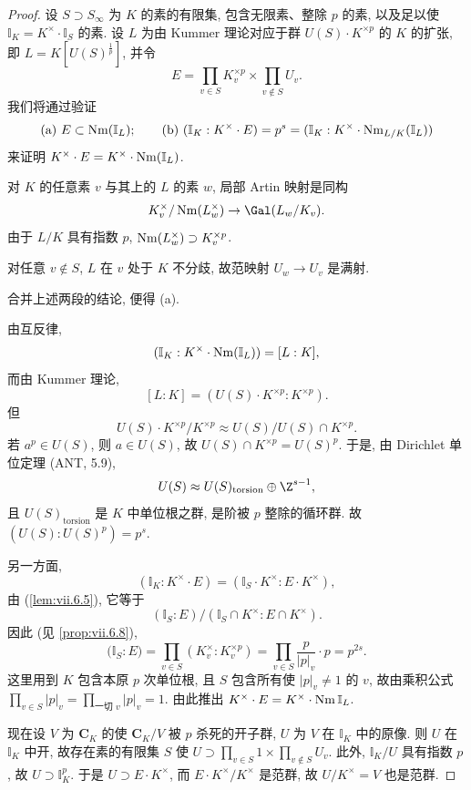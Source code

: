 \begin{proof}
设 $S\supset S_{\infty}$ 为 $K$ 的素的有限集, 包含无限素、整除 $p$ 的素, 以及足以使 $\mathbb{I}_K=K^{\times}\cdot\mathbb{I}_S$ 的素. 设 $L$ 为由 Kummer 理论对应于群 $U(S)\cdot K^{\times p}$ 的 $K$ 的扩张, 即 $L=K[U(S)^{\frac{1}{p}}]$, 并令
\[
E=\prod_{v\in S}K_{v}^{\times p}\times\prod_{v\notin S}U_{v}.
\]
我们将通过验证
\[
\text{(a)}\ E\subset\Nm(\mathbb{I}_{L});\qquad \text{(b)}\ (\mathbb{I}_{K}:K^{\times}\cdot E)=p^{s}=(\mathbb{I}_{K}:K^{\times}\cdot\Nm_{L/K}(\mathbb{I}_{L}))
\]
来证明 $K^{\times}\cdot E=K^{\times}\cdot\operatorname{Nm}(\mathbb{I}_L)$.

对 $K$ 的任意素 $v$ 与其上的 $L$ 的素 $w$, 局部 Artin 映射是同构
\[
K_{v}^{\times}/\Nm(L_{w}^{\times})\to\Gal(L_{w}/K_{v}).
\]
由于 $L/K$ 具有指数 $p$, $\operatorname{Nm}(L_{w}^{\times})\supset K_{v}^{\times p}$.

对任意 $v\notin S$, $L$ 在 $v$ 处于 $K$ 不分歧, 故范映射 $U_w\to U_v$ 是满射.

合并上述两段的结论, 便得 (a).

由互反律,
\[
(\mathbb{I}_{K}:K^{\times}\cdot\operatorname{Nm}(\mathbb{I}_{L}))=[L:K],
\]
而由 Kummer 理论,
\[
[L:K]=(U(S)\cdot K^{\times p}:K^{\times p}).
\]
但
\[
U(S)\cdot K^{\times p}/K^{\times p}\approx U(S)/U(S)\cap K^{\times p}.
\]
若 $a^{p}\in U(S)$, 则 $a\in U(S)$, 故 $U(S)\cap K^{\times p}=U(S)^{p}$. 于是, 由 Dirichlet 单位定理 (ANT, 5.9),
\[
U(S)\approx U(S)_{\mathrm{torsion}}\oplus\Z^{s-1},
\]
且 $U(S)_{\mathrm{torsion}}$ 是 $K$ 中单位根之群, 是阶被 $p$ 整除的循环群. 故 $(U(S):U(S)^{p})=p^{s}$.

另一方面,
\[
(\mathbb{I}_{K}:K^{\times}\cdot E)=(\mathbb{I}_{S}\cdot K^{\times}:E\cdot K^{\times}),
\]
由 (\ref{lem:vii.6.5}), 它等于
\[
(\mathbb{I}_{S}:E)/(\mathbb{I}_{S}\cap K^{\times}:E\cap K^{\times}).
\]
因此 (见 \ref{prop:vii.6.8}),
\[
\bigl(\mathbb{I}_{S}:E\bigr)=\prod_{v\in S}(K_{v}^{\times}:K_{v}^{\times p})=\prod_{v\in S}\frac{p}{|p|_{v}}\cdot p=p^{2s}.
\]
这里用到 $K$ 包含本原 $p$ 次单位根, 且 $S$ 包含所有使 $|p|_{v}\ne1$ 的 $v$, 故由乘积公式 $\prod_{v\in S}|p|_{v}=\prod_{\text{一切 }v}|p|_{v}=1$. 由此推出 $K^{\times}\cdot E=K^{\times}\cdot\operatorname{Nm}\mathbb{I}_{L}$.

现在设 $V$ 为 $\mathbf{C}_K$ 的使 $\mathbf{C}_K/V$ 被 $p$ 杀死的开子群, $U$ 为 $V$ 在 $\mathbb{I}_K$ 中的原像. 则 $U$ 在 $\mathbb{I}_K$ 中开, 故存在素的有限集 $S$ 使 $U\supset\prod_{v\in S}1\times\prod_{v\notin S}U_v$. 此外, $\mathbb{I}_K/U$ 具有指数 $p$, 故 $U\supset\mathbb{I}_K^{p}$. 于是 $U\supset E\cdot K^{\times}$, 而 $E\cdot K^{\times}/K^{\times}$ 是范群, 故 $U/K^{\times}=V$ 也是范群.
\end{proof}


